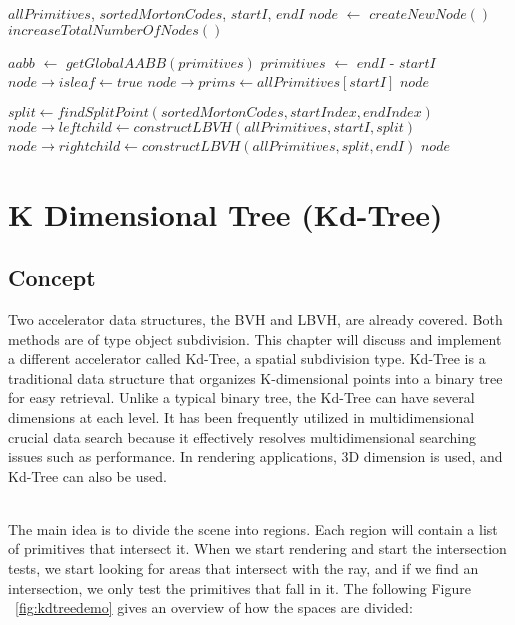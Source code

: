 \documentclass[11pt,a4paper]{article}
\begin{document}
\begin{algorithm}[H]
\caption{$constructLBVH$}\label{alg:alg1}
\begin{algorithmic}
		\Require $allPrimitives$, $sortedMortonCodes$, $startI$, $endI$
\State $node$ $\gets$ $createNewNode()$
\State $increaseTotalNumberOfNodes()$

\State $aabb$ $\gets$ $getGlobalAABB(primitives)$
\State $primitives$ $\gets$  $endI$ - $startI$
	\State $node \rightarrow isleaf \gets true$
	\State $node \rightarrow prims \gets allPrimitives[startI]$
	\State \Return $node$
\EndIf

\State $split \gets findSplitPoint(sortedMortonCodes, startIndex, endIndex)$
\State $node \rightarrow leftchild  \gets constructLBVH(allPrimitives, startI, split)$
\State $node \rightarrow rightchild  \gets constructLBVH(allPrimitives, split, endI)$
\State \Return $node$
\end{algorithmic}
\end{algorithm}
\clearpage



\section{K Dimensional Tree (Kd-Tree)}
\subsection{Concept}
Two accelerator data structures, the BVH and LBVH, are already covered. Both methods are of type object subdivision. This chapter will discuss and implement a different accelerator called Kd-Tree, a spatial subdivision type. Kd-Tree is a traditional data structure that organizes K-dimensional points into a binary tree for easy retrieval. Unlike a typical binary tree, the Kd-Tree can have several dimensions at each level. It has been frequently utilized in multidimensional crucial data search because it effectively resolves multidimensional searching issues such as performance. In rendering applications, 3D dimension is used, and Kd-Tree can also be used.

\noindent
\\
The main idea is to divide the scene into regions. Each region will contain a list of primitives that intersect it. When we start rendering and start the intersection tests, we start looking for areas that intersect with the ray, and if we find an intersection, we only test the primitives that fall in it. The following Figure ~\ref{fig:kdtreedemo} gives an overview of how the spaces are divided:
\end{document}
